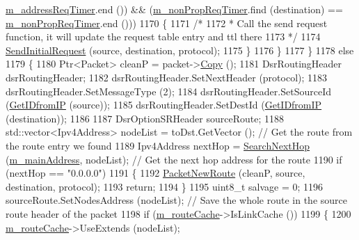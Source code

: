 \begin{DoxyCode}
      \hyperlink{classns3_1_1dsr_1_1DsrRouting_a47174823b0622573b681afc40d6ea558}{m\_addressReqTimer}.end ()) && (\hyperlink{classns3_1_1dsr_1_1DsrRouting_a0936df610f90f7e79c24a2a8cdea6c14}{m\_nonPropReqTimer}.find (destination) == 
      \hyperlink{classns3_1_1dsr_1_1DsrRouting_a0936df610f90f7e79c24a2a8cdea6c14}{m\_nonPropReqTimer}.end ()))
1170             \{
1171               \textcolor{comment}{/*}
1172 \textcolor{comment}{               * Call the send request function, it will update the request table entry and ttl there}
1173 \textcolor{comment}{               */}
1174               \hyperlink{classns3_1_1dsr_1_1DsrRouting_a74777d1806e768fccc1c2fe169b42c98}{SendInitialRequest} (source, destination, protocol);
1175             \}
1176         \}
1177     \}
1178   \textcolor{keywordflow}{else}
1179     \{
1180       Ptr<Packet> cleanP = packet->\hyperlink{classns3_1_1Packet_a5d5c70802a5f77fc5f0001e0cfc1898b}{Copy} ();
1181       DsrRoutingHeader dsrRoutingHeader;
1182       dsrRoutingHeader.SetNextHeader (protocol);
1183       dsrRoutingHeader.SetMessageType (2);
1184       dsrRoutingHeader.SetSourceId (\hyperlink{classns3_1_1dsr_1_1DsrRouting_a4593e50d5f36e9b9b013fe0422067c44}{GetIDfromIP} (source));
1185       dsrRoutingHeader.SetDestId (\hyperlink{classns3_1_1dsr_1_1DsrRouting_a4593e50d5f36e9b9b013fe0422067c44}{GetIDfromIP} (destination));
1186 
1187       DsrOptionSRHeader sourceRoute;
1188       std::vector<Ipv4Address> nodeList = toDst.GetVector ();     \textcolor{comment}{// Get the route from the route entry we
       found}
1189       Ipv4Address nextHop = \hyperlink{classns3_1_1dsr_1_1DsrRouting_aa1b16658c14499af76ca7dd69c034f22}{SearchNextHop} (\hyperlink{classns3_1_1dsr_1_1DsrRouting_a73182b5edee2d8460f28855e058fc9a0}{m\_mainAddress}, nodeList);      \textcolor{comment}{// Get
       the next hop address for the route}
1190       \textcolor{keywordflow}{if} (nextHop == \textcolor{stringliteral}{"0.0.0.0"})
1191         \{
1192           \hyperlink{classns3_1_1dsr_1_1DsrRouting_ae70ab39db551d1d81afc081196f78017}{PacketNewRoute} (cleanP, source, destination, protocol);
1193           \textcolor{keywordflow}{return};
1194         \}
1195       uint8\_t salvage = 0;
1196       sourceRoute.SetNodesAddress (nodeList);     \textcolor{comment}{// Save the whole route in the source route header of the
       packet}
1198 \textcolor{comment}{}      \textcolor{keywordflow}{if} (\hyperlink{classns3_1_1dsr_1_1DsrRouting_ac409bdb961b9fff0fb63ebd026be99ad}{m\_routeCache}->IsLinkCache ())
1199         \{
1200           \hyperlink{classns3_1_1dsr_1_1DsrRouting_ac409bdb961b9fff0fb63ebd026be99ad}{m\_routeCache}->UseExtends (nodeList);

\end{DoxyCode}
